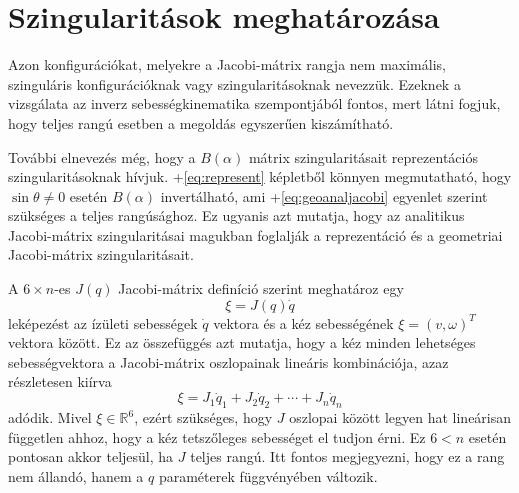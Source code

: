 \documentclass[12pt,a4paper]{report}
\theoremstyle{remark}
\theoremstyle{definition}
\begin{document}
\section{Szingularitások meghatározása}
Azon konfigurációkat, melyekre a Jacobi-mátrix rangja nem maximális, szinguláris konfigurációknak vagy 
szingularitásoknak nevezzük. Ezeknek a vizsgálata az inverz sebességkinematika szempontjából fontos, mert látni 
fogjuk, hogy teljes rangú esetben a megoldás egyszerűen kiszámítható. 

További elnevezés még, hogy a $B(\alpha)$ mátrix szingularitásait reprezentációs szingularitásoknak hívjuk. 
\Az+\eqref{eq:represent} képletből könnyen megmutatható, hogy $\sin \theta \neq 0$ esetén $B(\alpha)$ invertálható, 
ami \az+\eqref{eq:geoanaljacobi} egyenlet szerint szükséges a teljes rangúsághoz. Ez ugyanis azt mutatja, hogy az 
analitikus Jacobi-mátrix szingularitásai magukban foglalják a reprezentáció és a geometriai Jacobi-mátrix 
szingularitásait.

A $6 \times n$-es $J(q)$ Jacobi-mátrix definíció szerint meghatároz egy
\begin{equation}
\xi = J(q)\dot{q}
\end{equation}
leképezést az ízületi sebességek $\dot{q}$ vektora és a kéz sebességének $\xi = (v, \omega)^T$ vektora között. Ez az 
összefüggés azt mutatja, hogy a kéz minden lehetséges sebességvektora a Jacobi-mátrix oszlopainak lineáris 
kombinációja, azaz részletesen kiírva
\begin{equation}
\xi = J_1 \dot{q}_1 + J_2 \dot{q}_2 + \cdots + J_n \dot{q}_n
\end{equation}
adódik. Mivel $\xi \in \mathbb{R}^6$, ezért szükséges, hogy $J$ oszlopai között legyen hat lineárisan független 
ahhoz, hogy a kéz tetszőleges sebességet el tudjon érni. Ez $6 < n$ esetén pontosan akkor teljesül, ha $J$ teljes 
rangú. Itt fontos megjegyezni, hogy ez a rang nem állandó, hanem a $q$ paraméterek függvényében változik.
\end{document}
